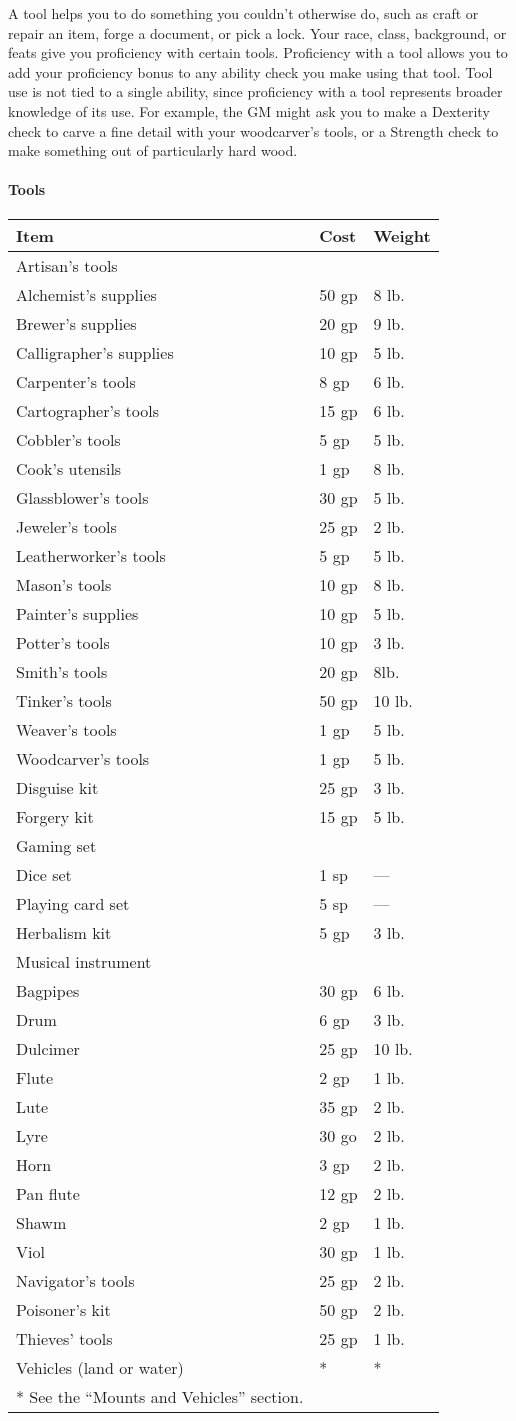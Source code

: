\documentclass[
]{article}
\begin{document}
A tool helps you to do something you couldn't otherwise do, such as
craft or repair an item, forge a document, or pick a lock. Your race,
class, background, or feats give you proficiency with certain tools.
Proficiency with a tool allows you to add your proficiency bonus to any
ability check you make using that tool. Tool use is not tied to a single
ability, since proficiency with a tool represents broader knowledge of
its use. For example, the GM might ask you to make a Dexterity check to
carve a fine detail with your woodcarver's tools, or a Strength check to
make something out of particularly hard wood.

\hypertarget{tools-1}{%
\paragraph{Tools}\label{tools-1}}

\begin{longtable}[]{@{}lll@{}}
\toprule
Item & Cost & Weight\tabularnewline
\midrule
\endhead
Artisan's tools & &\tabularnewline
Alchemist's supplies & 50 gp & 8 lb.\tabularnewline
Brewer's supplies & 20 gp & 9 lb.\tabularnewline
Calligrapher's supplies & 10 gp & 5 lb.\tabularnewline
Carpenter's tools & 8 gp & 6 lb.\tabularnewline
Cartographer's tools & 15 gp & 6 lb.\tabularnewline
Cobbler's tools & 5 gp & 5 lb.\tabularnewline
Cook's utensils & 1 gp & 8 lb.\tabularnewline
Glassblower's tools & 30 gp & 5 lb.\tabularnewline
Jeweler's tools & 25 gp & 2 lb.\tabularnewline
Leatherworker's tools & 5 gp & 5 lb.\tabularnewline
Mason's tools & 10 gp & 8 lb.\tabularnewline
Painter's supplies & 10 gp & 5 lb.\tabularnewline
Potter's tools & 10 gp & 3 lb.\tabularnewline
Smith's tools & 20 gp & 8lb.\tabularnewline
Tinker's tools & 50 gp & 10 lb.\tabularnewline
Weaver's tools & 1 gp & 5 lb.\tabularnewline
Woodcarver's tools & 1 gp & 5 lb.\tabularnewline
Disguise kit & 25 gp & 3 lb.\tabularnewline
Forgery kit & 15 gp & 5 lb.\tabularnewline
Gaming set & &\tabularnewline
Dice set & 1 sp & ---\tabularnewline
Playing card set & 5 sp & ---\tabularnewline
Herbalism kit & 5 gp & 3 lb.\tabularnewline
Musical instrument & &\tabularnewline
Bagpipes & 30 gp & 6 lb.\tabularnewline
Drum & 6 gp & 3 lb.\tabularnewline
Dulcimer & 25 gp & 10 lb.\tabularnewline
Flute & 2 gp & 1 lb.\tabularnewline
Lute & 35 gp & 2 lb.\tabularnewline
Lyre & 30 go & 2 lb.\tabularnewline
Horn & 3 gp & 2 lb.\tabularnewline
Pan flute & 12 gp & 2 lb.\tabularnewline
Shawm & 2 gp & 1 lb.\tabularnewline
Viol & 30 gp & 1 lb.\tabularnewline
Navigator's tools & 25 gp & 2 lb.\tabularnewline
Poisoner's kit & 50 gp & 2 lb.\tabularnewline
Thieves' tools & 25 gp & 1 lb.\tabularnewline
Vehicles (land or water) & * & *\tabularnewline
* See the ``Mounts and Vehicles'' section. & &\tabularnewline
\bottomrule
\end{longtable}
\end{document}
